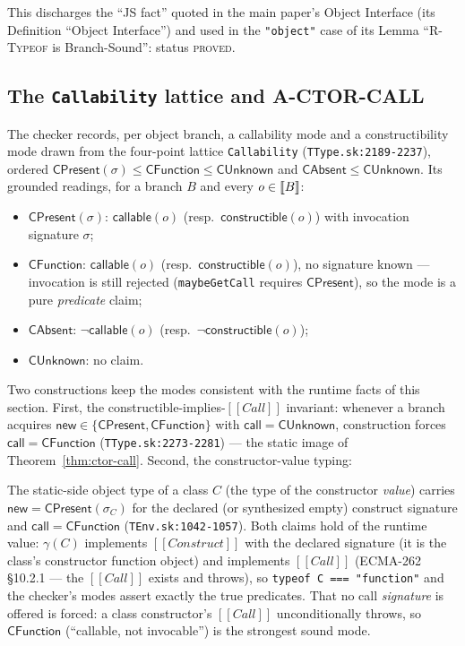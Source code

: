 \documentclass[11pt]{article}
\newcommand{\realize}{\gamma}
\newcommand{\ecma}[1]{ECMA-262 \S#1}
\newcommand{\intm}[1]{[[#1]]}
\begin{document}
This discharges the ``JS fact'' quoted in the main paper's Object
Interface (its Definition ``Object Interface'') and used in the
\texttt{"object"} case of its Lemma ``\textsc{R-Typeof} is Branch-Sound'':
status \textsc{proved}.

\subsection{The \texttt{Callability} lattice and \textbf{A-CTOR-CALL}}
\label{sec:callability}

The checker records, per object branch, a callability mode and a
constructibility mode drawn from the four-point lattice
\texttt{Callability}
(\texttt{TType.sk:2189-2237}), ordered
$\mathsf{CPresent}(\sigma) \le \mathsf{CFunction} \le
\mathsf{CUnknown}$ and $\mathsf{CAbsent} \le \mathsf{CUnknown}$. Its
grounded readings, for a branch $B$ and every $o \in \llbracket B \rrbracket$:
\begin{itemize}
\item $\mathsf{CPresent}(\sigma)$: $\mathsf{callable}(o)$
  (resp.\ $\mathsf{constructible}(o)$) with invocation signature
  $\sigma$;
\item $\mathsf{CFunction}$: $\mathsf{callable}(o)$
  (resp.\ $\mathsf{constructible}(o)$), no signature known — invocation
  is still rejected (\texttt{maybeGetCall} requires
  $\mathsf{CPresent}$), so the mode is a pure \emph{predicate} claim;
\item $\mathsf{CAbsent}$: $\neg\mathsf{callable}(o)$
  (resp.\ $\neg\mathsf{constructible}(o)$);
\item $\mathsf{CUnknown}$: no claim.
\end{itemize}
Two constructions keep the modes consistent with the runtime facts of
this section. First, the constructible-implies-$\intm{Call}$ invariant:
whenever a branch acquires $\mathsf{new} \in
\{\mathsf{CPresent}, \mathsf{CFunction}\}$ with
$\mathsf{call} = \mathsf{CUnknown}$, construction forces
$\mathsf{call} = \mathsf{CFunction}$
(\texttt{TType.sk:2273-2281}) — the static image of
Theorem~\ref{thm:ctor-call}. Second, the constructor-value typing:

\begin{theorem}
\label{thm:ctor-modes}
The static-side object type of a class $C$ (the type of the constructor
\emph{value}) carries $\mathsf{new} = \mathsf{CPresent}(\sigma_C)$ for
the declared (or synthesized empty) construct signature and
$\mathsf{call} = \mathsf{CFunction}$
(\texttt{TEnv.sk:1042-1057}). Both claims hold of the runtime value:
$\realize(C)$ implements $\intm{Construct}$ with the declared signature
(it is the class's constructor function object) and implements
$\intm{Call}$ (\ecma{10.2.1} — the $\intm{Call}$ exists and throws), so
\texttt{typeof C === "function"} and the checker's modes assert exactly
the true predicates. That no call \emph{signature} is offered is
forced: a class constructor's $\intm{Call}$ unconditionally throws, so
$\mathsf{CFunction}$ (``callable, not invocable'') is the strongest
sound mode.
\end{theorem}
\end{document}
